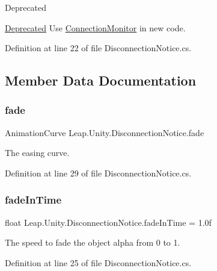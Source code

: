 \begin{DoxyRefDesc}{Deprecated}
\item[\mbox{\hyperlink{deprecated__deprecated000001}{Deprecated}}]Use \mbox{\hyperlink{class_leap_1_1_unity_1_1_connection_monitor}{Connection\+Monitor}} in new code. \end{DoxyRefDesc}


Definition at line 22 of file Disconnection\+Notice.\+cs.



\subsection{Member Data Documentation}
\mbox{\label{class_leap_1_1_unity_1_1_disconnection_notice_a790ba197bec4ec0a035f01505d3b5cc1}} 
\subsubsection{\texorpdfstring{fade}{fade}}
{\footnotesize\ttfamily Animation\+Curve Leap.\+Unity.\+Disconnection\+Notice.\+fade}

The easing curve. 

Definition at line 29 of file Disconnection\+Notice.\+cs.

\mbox{\label{class_leap_1_1_unity_1_1_disconnection_notice_a5236c20bc41466e9b41791b3ef5c19d6}} 
\subsubsection{\texorpdfstring{fadeInTime}{fadeInTime}}
{\footnotesize\ttfamily float Leap.\+Unity.\+Disconnection\+Notice.\+fade\+In\+Time = 1.\+0f}

The speed to fade the object alpha from 0 to 1. 

Definition at line 25 of file Disconnection\+Notice.\+cs.

\mbox{\label{class_leap_1_1_unity_1_1_disconnection_notice_ab0d46e8e760f64e5d576bb5d17647d9c}} 
